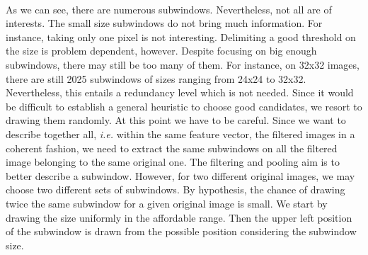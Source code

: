 \documentclass[a4paper]{report}
\begin{document}
		\paragraph{}
		As we can see, there are numerous subwindows. Nevertheless, not all are of interests. The small size subwindows do not bring much information. For instance, taking only one pixel is not interesting. Delimiting a good threshold on the size is problem dependent, however. Despite focusing on big enough subwindows, there may still be too many of them. For instance, on 32x32 images, there are still 2025 subwindows of sizes ranging from 24x24 to 32x32. Nevertheless, this entails a redundancy level which is not needed.
		Since it would be difficult to establish a general heuristic to choose good candidates, we resort to drawing them randomly. 
		At this point we have to be careful. Since we want to describe together all, \textit{i.e.} within the same feature vector, the filtered images in a coherent fashion, we need to extract the same subwindows on all the filtered image belonging to the same original one. The filtering and pooling aim is to better describe a subwindow. However, for two different original images, we may choose two different sets of subwindows.
		By hypothesis, the chance of drawing twice the same subwindow for a given original image is small.
		We start by drawing the size uniformly in the affordable range. Then the upper left position of the subwindow is drawn from the possible position considering the subwindow size.
		
\end{document}

